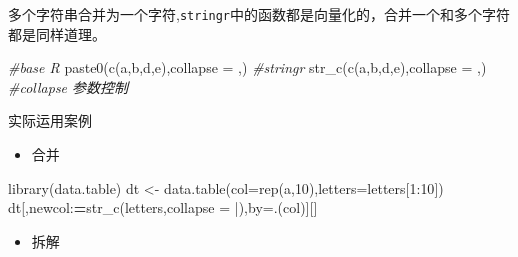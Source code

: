 \documentclass[
]{book}
\newenvironment{Shaded}{\begin{snugshade}}{\end{snugshade}}
\newcommand{\AttributeTok}[1]{\textcolor[rgb]{0.77,0.63,0.00}{#1}}
\newcommand{\CommentTok}[1]{\textcolor[rgb]{0.56,0.35,0.01}{\textit{#1}}}
\newcommand{\DecValTok}[1]{\textcolor[rgb]{0.00,0.00,0.81}{#1}}
\newcommand{\ErrorTok}[1]{\textcolor[rgb]{0.64,0.00,0.00}{\textbf{#1}}}
\newcommand{\FunctionTok}[1]{\textcolor[rgb]{0.00,0.00,0.00}{#1}}
\newcommand{\NormalTok}[1]{#1}
\newcommand{\OtherTok}[1]{\textcolor[rgb]{0.56,0.35,0.01}{#1}}
\newcommand{\SpecialCharTok}[1]{\textcolor[rgb]{0.00,0.00,0.00}{#1}}
\newcommand{\StringTok}[1]{\textcolor[rgb]{0.31,0.60,0.02}{#1}}
\providecommand{\tightlist}{%
  \setlength{\itemsep}{0pt}\setlength{\parskip}{0pt}}
\begin{document}
多个字符串合并为一个字符,\texttt{stringr}中的函数都是向量化的，合并一个和多个字符都是同样道理。

\begin{Shaded}
\begin{Highlighting}[]
\CommentTok{\#base R}
\FunctionTok{paste0}\NormalTok{(}\FunctionTok{c}\NormalTok{(}\StringTok{\textquotesingle{}a\textquotesingle{}}\NormalTok{,}\StringTok{\textquotesingle{}b\textquotesingle{}}\NormalTok{,}\StringTok{\textquotesingle{}d\textquotesingle{}}\NormalTok{,}\StringTok{\textquotesingle{}e\textquotesingle{}}\NormalTok{),}\AttributeTok{collapse =} \StringTok{\textquotesingle{},\textquotesingle{}}\NormalTok{)}
\CommentTok{\#stringr}
\FunctionTok{str\_c}\NormalTok{(}\FunctionTok{c}\NormalTok{(}\StringTok{\textquotesingle{}a\textquotesingle{}}\NormalTok{,}\StringTok{\textquotesingle{}b\textquotesingle{}}\NormalTok{,}\StringTok{\textquotesingle{}d\textquotesingle{}}\NormalTok{,}\StringTok{\textquotesingle{}e\textquotesingle{}}\NormalTok{),}\AttributeTok{collapse =} \StringTok{\textquotesingle{},\textquotesingle{}}\NormalTok{)  }\CommentTok{\#collapse 参数控制}
\end{Highlighting}
\end{Shaded}

实际运用案例

\begin{itemize}
\tightlist
\item
  合并
\end{itemize}

\begin{Shaded}
\begin{Highlighting}[]
\FunctionTok{library}\NormalTok{(data.table)}
\NormalTok{dt }\OtherTok{\textless{}{-}} \FunctionTok{data.table}\NormalTok{(}\AttributeTok{col=}\FunctionTok{rep}\NormalTok{(}\StringTok{\textquotesingle{}a\textquotesingle{}}\NormalTok{,}\DecValTok{10}\NormalTok{),}\AttributeTok{letters=}\NormalTok{letters[}\DecValTok{1}\SpecialCharTok{:}\DecValTok{10}\NormalTok{])}
\NormalTok{dt[,newcol}\SpecialCharTok{:}\ErrorTok{=}\FunctionTok{str\_c}\NormalTok{(letters,}\AttributeTok{collapse =} \StringTok{\textquotesingle{}|\textquotesingle{}}\NormalTok{),by}\OtherTok{=}\NormalTok{.(col)][]}
\end{Highlighting}
\end{Shaded}

\begin{itemize}
\tightlist
\item
  拆解
\end{itemize}
\end{document}
